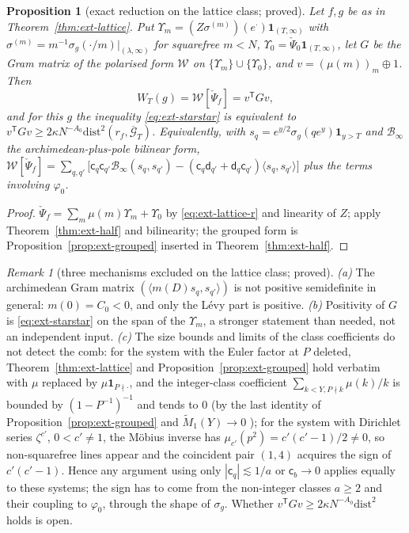 \documentclass[11pt]{amsart}
\newtheorem{proposition}[theorem]{Proposition}
\theoremstyle{definition}
\theoremstyle{remark}
\newtheorem{remark}[theorem]{Remark}
\begin{document}
\begin{proposition}[exact reduction on the lattice class; proved]\label{prop:ext-latred}
Let $f,g$ be as in Theorem~\ref{thm:ext-lattice}. Put $\Upsilon_m=(Z\sigma^{(m)})(e^\cdot)\mathbf 1_{(T,\infty)}$ with
$\sigma^{(m)}=m^{-1}\sigma_g(\cdot/m)|_{(\lambda,\infty)}$ for squarefree $m<N$, $\Upsilon_0=\check\Psi_0\mathbf 1_{(T,\infty)}$, let $G$ be the
Gram matrix of the polarised form $\mathcal W$ on $\{\Upsilon_m\}\cup\{\Upsilon_0\}$, and $v=(\mu(m))_m\oplus1$. Then
\[
W_T(g)=\mathcal W[\check\Psi_f]=v^{\mathsf T}Gv,
\]
and for this $g$ the inequality \eqref{eq:ext-starstar} is equivalent to $v^{\mathsf T}Gv\ge2\kappa N^{-A_0}\mathrm{dist}^2(r_f,\overline{\mathcal G}_T)$.
Equivalently, with $s_q=e^{y/2}\sigma_g(qe^y)\mathbf 1_{y>T}$ and $\mathcal B_\infty$ the archimedean-plus-pole bilinear form,
$\mathcal W[\check\Psi_f]=\sum_{q,q'}\big[\mathsf c_q\mathsf c_{q'}\mathcal B_\infty(s_q,s_{q'})-(\mathsf c_q\mathsf d_{q'}+\mathsf d_q\mathsf c_{q'})\langle s_q,s_{q'}\rangle\big]$
plus the terms involving $\varphi_0$.
\end{proposition}
\begin{proof}
$\check\Psi_f=\sum_m\mu(m)\Upsilon_m+\Upsilon_0$ by \eqref{eq:ext-lattice-r} and linearity of $Z$; apply Theorem~\ref{thm:ext-half} and
bilinearity; the grouped form is Proposition~\ref{prop:ext-grouped} inserted in Theorem~\ref{thm:ext-half}.
\end{proof}

\begin{remark}[three mechanisms excluded on the lattice class; proved]\label{rem:ext-latno}
\emph{(a)} The archimedean Gram matrix $(\langle m(D)s_q,s_{q'}\rangle)$ is not positive semidefinite in general: $m(0)=C_0<0$, and
only the L\'evy part is positive. \emph{(b)} Positivity of $G$ is \eqref{eq:ext-starstar} on the span of the $\Upsilon_m$, a stronger
statement than needed, not an independent input. \emph{(c)} The size bounds and limits of the class coefficients do not
detect the comb: for the system with the Euler factor at $P$ deleted, Theorem~\ref{thm:ext-lattice} and
Proposition~\ref{prop:ext-grouped} hold verbatim with $\mu$ replaced by $\mu\mathbf 1_{P\nmid\cdot}$, and the integer-class coefficient
$\sum_{k<Y,P\nmid k}\mu(k)/k$ is bounded by $(1-P^{-1})^{-1}$ and tends to $0$ (by the last identity of
Proposition~\ref{prop:ext-grouped} and $\widetilde M_1(Y)\to0$ \cite{MontgomeryVaughan2007}); for the system with Dirichlet series
$\zeta^{c'}$, $0<c'\ne1$, the M\"obius inverse has $\mu_{c'}(p^2)=c'(c'-1)/2\ne0$, so non-squarefree lines appear and the coincident
pair $(1,4)$ acquires the sign of $c'(c'-1)$. Hence any argument using only $|\mathsf c_q|\lesssim1/a$ or $\mathsf c_b\to0$ applies equally
to these systems; the sign has to come from the non-integer classes $a\ge2$ and their coupling to $\varphi_0$, through the shape of
$\sigma_g$. Whether $v^{\mathsf T}Gv\ge2\kappa N^{-A_0}\mathrm{dist}^2$ holds is open.
\end{remark}
\end{document}
